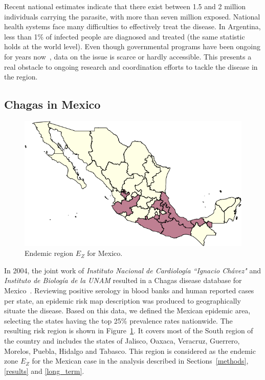 Recent national estimates indicate that there exist between 1.5 and 2 million individuals carrying the parasite, with more than seven million exposed. National health systems face many difficulties to effectively treat the disease. 
In Argentina, less than 1\% of infected people are diagnosed and treated 
(the same statistic holds at the world level).
Even though governmental programs have been ongoing for years now~\cite{plan_nacional_chagas}, data on the issue is scarce or hardly accessible. This presents a real obstacle to ongoing research and coordination efforts to tackle the disease in the region.


\subsection{Chagas in  Mexico} \label{endemic_zone_mexico}


\begin{figure}[h!]
\centering
\includegraphics[width=0.75\linewidth]
{figures/Ambientes_Gran_Chaco-Mexico1/Ambientes_Gran_Chaco-Mexico1.png}
\caption{Endemic region $E_Z$ for Mexico.}
\label{fig:endemic_zone_mexico}
\end{figure}

In 2004, the joint work of \textit{Instituto Nacional de Cardiología ``Ignacio Chávez"} and  \textit{Instituto de Biología de la UNAM} resulted in a Chagas disease database for Mexico~\cite{cruz2006chagmex}. Reviewing positive serology in blood banks and human reported cases per state, an epidemic risk map description was produced to geographically situate the disease. Based on this data, we defined the Mexican epidemic area, selecting the states having the top 25\% prevalence rates nationwide. The resulting risk region is shown in Figure~\ref{fig:endemic_zone_mexico}. It covers most of the South region of the country and includes the states of Jalisco, Oaxaca, Veracruz, Guerrero, Morelos, Puebla, Hidalgo and Tabasco.
This region is considered as the endemic zone $E_Z$ for the Mexican case in the analysis described in Sections~\ref{methods}, \ref{results} and \ref{long_term}.



